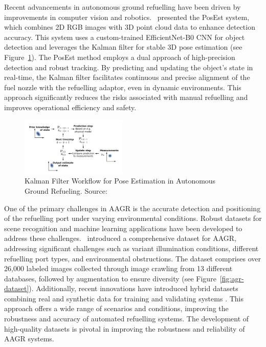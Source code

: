 \documentclass[12pt,oneside]{book} %
\begin{document}
\newpage
Recent advancements in autonomous ground refuelling have been driven by
improvements in computer vision and robotics.~\citet{AGRPoseEstimation}
presented the PosEst system, which combines 2D RGB images with 3D point cloud
data to enhance detection accuracy. This system uses a custom-trained
EfficientNet-B0 CNN for object detection and leverages the Kalman filter for
stable 3D pose estimation (see Figure~\ref{fig:agr-pose-kalman}). The PosEst
method employs a dual approach of high-precision detection and robust tracking.
By predicting and updating the object’s state in real-time, the Kalman filter
facilitates continuous and precise alignment of the fuel nozzle with the
refuelling adaptor, even in dynamic environments. This approach significantly
reduces the risks associated with manual refuelling and improves operational
efficiency and safety.

\begin{figure}[H]
    \centering
    \includegraphics[width=0.45\textwidth]{figures/AGRPoseKalman.png}
    \caption{Kalman Filter Workflow for Pose Estimation in Autonomous Ground Refueling. Source: \citet{AGRPoseEstimation}}\label{fig:agr-pose-kalman}
\end{figure}

One of the primary challenges in AAGR is the accurate detection and positioning
of the refuelling port under varying environmental conditions. Robust datasets
for scene recognition and machine learning applications have been developed to
address these challenges.~\citet{DatasetAGR} introduced a comprehensive dataset
for AAGR, addressing significant challenges such as variant illumination
conditions, different refuelling port types, and environmental obstructions.
The dataset comprises over 26,000 labeled images collected through image
crawling from 13 different databases, followed by augmentation to ensure
diversity (see Figure~\ref{fig:agr-dataset}). Additionally, recent innovations
have introduced hybrid datasets combining real and synthetic data for training
and validating systems \cite{HybridDatasetAGRV1}. This approach offers a wide
range of scenarios and conditions, improving the robustness and accuracy of
automated refuelling systems. The development of high-quality datasets is
pivotal in improving the robustness and reliability of AAGR systems.
\end{document}
